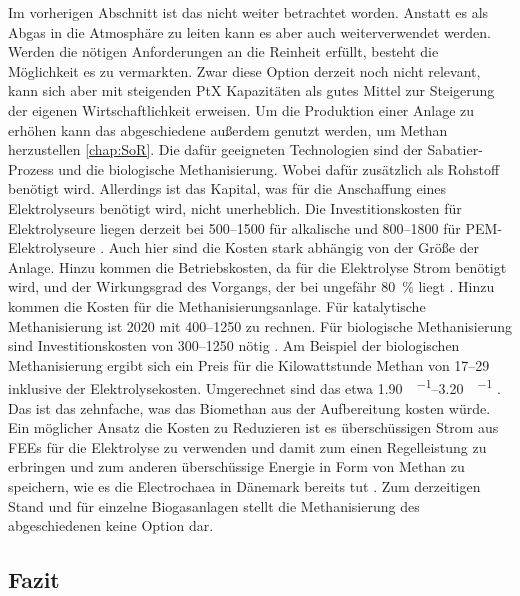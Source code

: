 Im vorherigen Abschnitt ist das  nicht weiter betrachtet worden. Anstatt es als Abgas in die Atmosphäre zu leiten kann es aber auch weiterverwendet werden. Werden die nötigen Anforderungen an die Reinheit erfüllt, besteht die Möglichkeit es zu vermarkten. Zwar diese Option derzeit noch nicht relevant, kann sich aber mit steigenden PtX Kapazitäten als gutes Mittel zur Steigerung der eigenen Wirtschaftlichkeit erweisen. \parencite{UmBA19} \newline
Um die Produktion einer Anlage zu erhöhen kann das abgeschiedene  außerdem genutzt werden, um Methan herzustellen \ref{chap:SoR}. Die dafür geeigneten Technologien sind der Sabatier-Prozess und die biologische Methanisierung. Wobei dafür zusätzlich  als Rohstoff benötigt wird. Allerdings ist das Kapital, was für die Anschaffung eines Elektrolyseurs benötigt wird, nicht unerheblich. Die Investitionskosten für Elektrolyseure liegen derzeit bei \SIrange{500}{1500}{\Eurkw} für alkalische und \SIrange{800}{1800}{\Eurkw} für PEM-Elektrolyseure \parencite{dena2018b}. Auch hier sind die Kosten stark abhängig von der Größe der Anlage. Hinzu kommen die Betriebskosten, da für die Elektrolyse Strom benötigt wird, und der Wirkungsgrad des Vorgangs, der bei ungefähr \SI{80}{\percent} liegt \parencite{dena2018b}. Hinzu kommen die Kosten für die Methanisierungsanlage. Für katalytische Methanisierung ist \SI{2020}{\relax} mit \SIrange{400}{1250}{\Eurkw} zu rechnen. Für biologische Methanisierung sind Investitionskosten von \SIrange{300}{1250}{\Eurkw} nötig \parencite{dena2018b}. Am Beispiel der biologischen Methanisierung ergibt sich ein Preis für die Kilowattstunde Methan von \SIrange{17}{29}{\ct} inklusive der Elektrolysekosten. Umgerechnet sind das etwa \SIrange{1,90}{3,20}{\sieuro\per\normvol} \parencite{4.2b17}. Das ist das zehnfache, was das Biomethan aus der Aufbereitung kosten würde. Ein möglicher Ansatz die Kosten zu Reduzieren ist es überschüssigen Strom aus \glspl{FEE} für die Elektrolyse zu verwenden und damit zum einen Regelleistung zu erbringen und zum anderen überschüssige Energie in Form von Methan zu speichern, wie es die Electrochaea in Dänemark bereits tut \parencite{Chaea20}. Zum derzeitigen Stand und für einzelne Biogasanlagen stellt die Methanisierung des abgeschiedenen  keine Option dar.


\subsection{Fazit}

